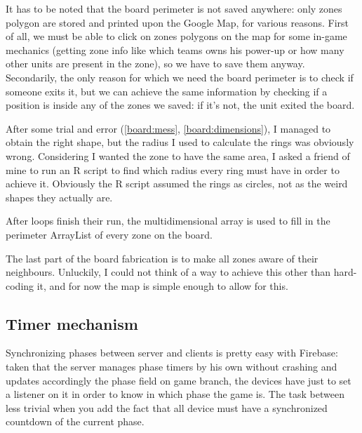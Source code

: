 			
			
			It has to be noted that the board perimeter is not saved anywhere: only zones polygon are stored and printed upon the Google Map, for various reasons.
			First of all, we must be able to click on zones polygons on the map for some in-game mechanics (getting zone info like which teams owns his power-up or how many other units are present in the zone), so we have to save them anyway.
			Secondarily, the only reason for which we need the board perimeter is to check if someone exits it, but we can achieve the same information by checking if a position is inside any of the zones we saved: if it's not, the unit exited the board.
			
			
			After some trial and error (\autoref{board:mess},  \autoref{board:dimensions}), I managed to obtain the right shape, but the radius I used to calculate the rings was obviously wrong.
			Considering I wanted the zone to have the same area, I asked a friend of mine to run an R script to find which radius every ring must have in order to achieve it. Obviously the R script assumed the rings as circles, not as the weird shapes they actually are.
			
			After loops finish their run, the multidimensional array is used to fill in the perimeter ArrayList of every zone on the board.
			
			The last part of the board fabrication is to make all zones aware of their neighbours. Unluckily, I could not think of a way to achieve this other than hard-coding it, and for now the map is simple enough to allow for this.
			
		\subsection{Timer mechanism}\label{focus:timer}
		
			Synchronizing phases between server and clients is pretty easy with Firebase: taken that the server manages phase timers by his own without crashing and updates accordingly the phase field on game branch, the devices have just to set a listener on it in order to know in which phase the game is.
			The task between less trivial when you add the fact that all device must have a synchronized countdown of the current phase.
			

